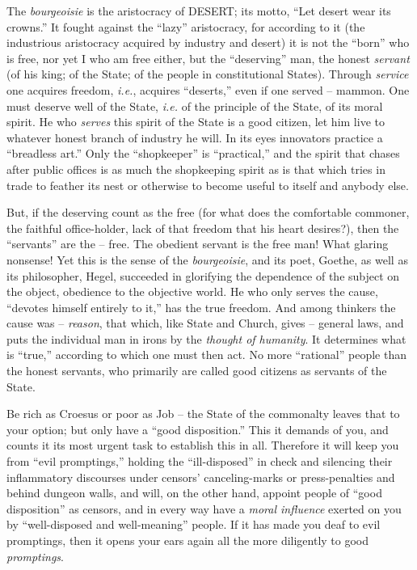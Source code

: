 \documentclass[12pt,a4paper]{book}
\begin{document}
The \textit{bourgeoisie} is the aristocracy of DESERT; its motto, ``Let 
desert wear its crowns.'' It fought against the ``lazy'' aristocracy, for 
according to it (the industrious aristocracy acquired by industry and desert) 
it is not the ``born'' who is free, nor yet I who am free either, but the 
``deserving'' man, the honest \textit{servant} (of his king; of the State; 
of the people in constitutional States). Through \textit{service} one acquires 
freedom, \textit{i.e.}, acquires ``deserts,'' even if one served -- mammon. 
One must deserve well of the State, \textit{i.e.} of the principle of the 
State, of its moral spirit. He who \textit{serves} this spirit of the State is 
a good citizen, let him live to whatever honest branch of industry he will. In 
its eyes innovators practice a ``breadless art.'' Only the ``shopkeeper'' 
is ``practical,'' and the spirit that chases after public offices is as much 
the shopkeeping spirit as is that which tries in trade to feather its nest or 
otherwise to become useful to itself and anybody else.

But, if the deserving count as the free (for what does the comfortable 
commoner, the faithful office-holder, lack of that freedom that his heart 
desires?), then the ``servants'' are the -- free. The obedient servant is 
the free man! What glaring nonsense! Yet this is the sense of the 
\textit{bourgeoisie}, and its poet, Goethe, as well as its philosopher, Hegel, 
succeeded in glorifying the dependence of the subject on the object, obedience 
to the objective world. He who only serves the cause, ``devotes himself 
entirely to it,'' has the true freedom. And among thinkers the cause was -- 
\textit{reason}, that which, like State and Church, gives -- general laws, and 
puts the individual man in irons by the \textit{thought of humanity}. It 
determines what is ``true,'' according to which one must then act. No more 
``rational'' people than the honest servants, who primarily are called good 
citizens as servants of the State.

Be rich as Croesus or poor as Job -- the State of the commonalty leaves that 
to your option; but only have a ``good disposition.'' This it demands of 
you, and counts it its most urgent task to establish this in all. Therefore it 
will keep you from ``evil promptings,'' holding the ``ill-disposed'' in 
check and silencing their inflammatory discourses under censors' 
canceling-marks or press-penalties and behind dungeon walls, and will, on the 
other hand, appoint people of ``good disposition'' as censors, and in every 
way have a \textit{moral influence} exerted on you by ``well-disposed and 
well-meaning'' people. If it has made you deaf to evil promptings, then it 
opens your ears again all the more diligently to good \textit{promptings}.
\end{document}
